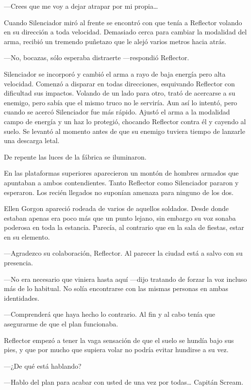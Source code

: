 ---Crees que me voy a dejar atrapar por mi propia\dots

Cuando Silenciador miró al frente se encontró con que tenía a Reflector volando en su dirección a toda velocidad. Demasiado cerca para cambiar la modalidad del arma, recibió un tremendo puñetazo que le alejó varios metros hacia atrás.

---No, bocazas, sólo esperaba distraerte ---respondió Reflector.

Silenciador se incorporó y cambió el arma a rayo de baja energía pero alta velocidad. Comenzó a disparar en todas direcciones, esquivando Reflector con dificultad sus impactos. Volando de un lado para otro, trató de acercarse a su enemigo, pero sabía que el mismo truco no le serviría. Aun así lo intentó, pero cuando se acercó Silenciador fue más rápido. Ajustó el arma a la modalidad campo de energía y un haz lo protegió, chocando Reflector contra él y cayendo al suelo. Se levantó al momento antes de que su enemigo tuviera tiempo de lanzarle una descarga letal.

De repente las luces de la fábrica se iluminaron.

En las plataformas superiores aparecieron un montón de hombres armados que apuntaban a ambos contendientes. Tanto Reflector como Silenciador pararon y esperaron. Los recién llegados no suponían amenaza para ninguno de los dos.

Ellen Gorgon apareció rodeada de varios de aquellos soldados. Desde donde estaban apenas era poco más que un punto lejano, sin embargo su voz sonaba poderosa en toda la estancia. Parecía, al contrario que en la sala de fiestas, estar en su elemento.

---Agradezco su colaboración, Reflector. Al parecer la ciudad está a salvo con su presencia.

---No era necesario que viniera hasta aquí ---dijo tratando de forzar la voz incluso más de lo habitual. No solía encontrarse con las mismas personas en ambas identidades.

---Comprenderá que haya hecho lo contrario. Al fin y al cabo tenía que asegurarme de que el plan funcionaba.

Reflector empezó a tener la vaga sensación de que el suelo se hundía bajo sus pies, y que por mucho que supiera volar no podría evitar hundirse a su vez.

---¿De qué está hablando?

---Hablo del plan para acabar con usted de una vez por todas\dots{} Capitán Scream.

